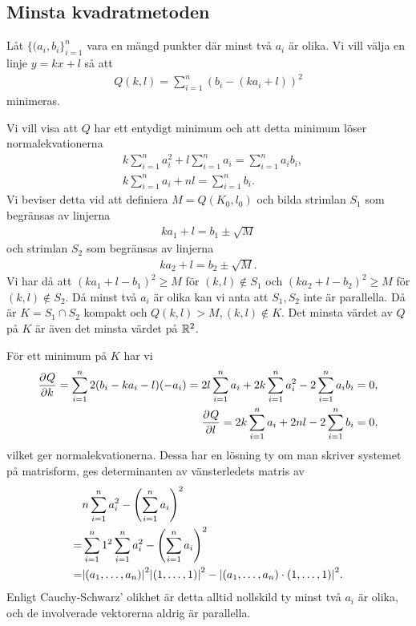 \subsection{Minsta kvadratmetoden}
Låt $\{(a_i, b_i\}_{i = 1}^{n}$ vara en mängd punkter där minst två $a_i$ är olika. Vi vill välja en linje $y = kx + l$ så att
\begin{align*}
	Q(k, l) = \sum\limits_{i = 1}^{n}(b_i - (ka_i + l))^2
\end{align*}
minimeras.

Vi vill visa att $Q$ har ett entydigt minimum och att detta minimum löser normalekvationerna
\begin{align*}
	&k\sum\limits_{i = 1}^{n}a_i^2 + l\sum\limits_{i = 1}^{n}a_i = \sum\limits_{i = 1}^{n}a_ib_i, \\
	&k\sum\limits_{i = 1}^{n}a_i + nl = \sum\limits_{i = 1}^{n}b_i.
\end{align*}
Vi beviser detta vid att definiera $M = Q(K_0, l_0)$ och bilda strimlan $S_1$ som begränsas av linjerna
\begin{align*}
	ka_1 + l = b_1 \pm\sqrt{M}
\end{align*}
och strimlan $S_2$ som begränsas av linjerna
\begin{align*}
	ka_2 + l = b_2 \pm\sqrt{M}.
\end{align*}
Vi har då att $(ka_1 + l - b_1)^2\geq M$ för $(k, l)\not\in S_1$ och $(ka_2 + l - b_2)^2\geq M$ för $(k, l)\not\in S_2$. Då minst två $a_i$ är olika kan vi anta att $S_1, S_2$ inte är parallella. Då är $K = S_1\cap S_2$ kompakt och $Q(k, l) > M, (k, l)\not\in K$. Det minsta värdet av $Q$ på $K$ är även det minsta värdet på $\mathbb{R}^2$.

För ett minimum på $K$ har vi
\begin{align*}
	\pdv[]{Q}{k} (k, l) = \sum\limits_{i = 1}^{n}2(b_i - ka_i - l)(-a_i) = 2l\sum\limits_{i = 1}^{n}a_i + 2k\sum\limits_{i = 1}^{n}a_i^2 - 2\sum\limits_{i = 1}^{n}a_ib_i = 0, \\
	\pdv[]{Q}{l} (k, l) = 2k\sum\limits_{i = 1}^{n}a_i + 2nl - 2\sum\limits_{i = 1}^{n}b_i = 0,
\end{align*}
vilket ger normalekvationerna. Dessa har en lösning ty om man skriver systemet på matrisform, ges determinanten av vänsterledets matris av
\begin{align*}
	 &n\sum\limits_{i = 1}^{n}a_i^2 - \left(\sum\limits_{i = 1}^{n}a_i\right)^2 \\
	=& \sum\limits_{i = 1}^{n}1^2\sum\limits_{i = 1}^{n}a_i^2 - \left(\sum\limits_{i = 1}^{n}a_i\right)^2 \\
	=& \abs{(a_1, \dots, a_n)}^2\abs{(1, \dots, 1)}^2 - \abs{(a_1, \dots, a_n)\cdot (1, \dots, 1)}^2.
\end{align*}
Enligt Cauchy-Schwarz' olikhet är detta alltid nollskild ty minst två $a_i$ är olika, och de involverade vektorerna aldrig är parallella.